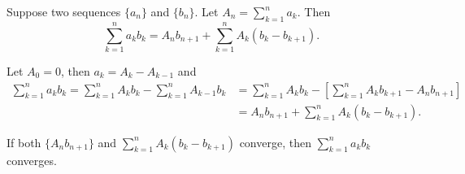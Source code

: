     \begin{lemmaenv}
        Suppose two sequences $\{a_n\}$ and $\{b_n\}$. Let $\displaystyle A_n = \sum_{k=1}^n a_k$. Then
        \[
        \sum_{k=1}^{n} a_k b_k = A_n b_{n+1} + \sum_{k=1}^n A_k (b_k - b_{k+1}).
        \]
         
    \end{lemmaenv}
    \begin{proofenv}
        Let $A_0=0$, then $a_k = A_k - A_{k-1}$ and 
        \[
        \begin{aligned}
            \sum_{k=1}^n a_k b_k = \sum_{k=1}^n A_k b_k - \sum_{k=1}^n A_{k-1} b_k &= \sum_{k=1}^n A_k b_k - \left[ \sum_{k=1}^n A_kb_{k+1} - A_nb_{n+1} \right]\\ &= A_n b_{n+1} + \sum_{k=1}^n A_k (b_k - b_{k+1}).
        \end{aligned}
        \]
    \end{proofenv}
    \begin{remarkenv}
        If both $\{A_nb_{n+1}\}$ and $\displaystyle \sum_{k=1}^n A_k (b_k - b_{k+1})$ converge, then $\displaystyle \sum_{k=1}^n a_k b_k$ converges.
    \end{remarkenv}
    
